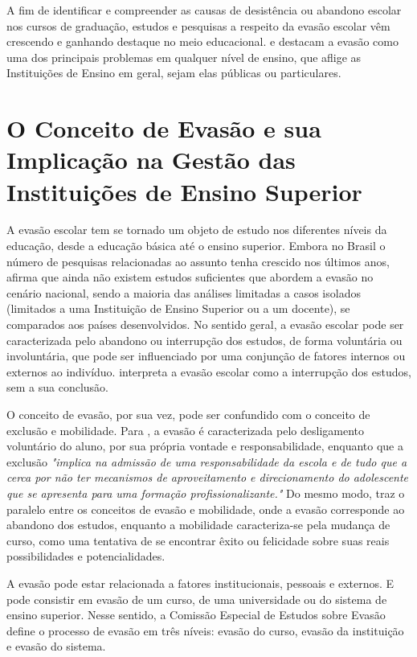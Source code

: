 A fim de identificar e compreender as causas de desistência ou abandono escolar nos cursos de graduação, estudos e pesquisas a respeito da evasão escolar vêm crescendo e ganhando destaque no meio educacional. \citet{lobo2011} e \citet{dias2010} destacam a evasão como uma dos principais problemas em qualquer nível de ensino, que aflige as Instituições de Ensino em geral, sejam elas públicas ou particulares.
 

\section{O Conceito de Evasão e sua Implicação na Gestão das Instituições de Ensino Superior} \label{2title2}

A evasão escolar tem se tornado um  objeto de estudo nos diferentes níveis da educação, desde a educação básica até o ensino superior. Embora no Brasil o número de pesquisas relacionadas ao assunto tenha crescido nos últimos anos, \citet{lobo2011} afirma que ainda não existem estudos suficientes que abordem a evasão no cenário nacional, sendo a maioria das análises limitadas a casos isolados (limitados a uma Instituição de Ensino Superior ou a um docente), se comparados aos países desenvolvidos. No sentido geral, a evasão escolar pode ser caracterizada pelo abandono ou interrupção dos estudos, de forma voluntária ou involuntária, que pode ser influenciado por uma conjunção de fatores internos ou externos ao indivíduo. \citet{gaioso2005} interpreta a evasão escolar como a interrupção dos estudos, sem a sua conclusão. 

O conceito de evasão, por sua vez, pode ser confundido com o conceito de exclusão e mobilidade. Para \citet[p. 13]{bueno1993}, a evasão é caracterizada pelo desligamento voluntário do aluno, por sua própria vontade e responsabilidade, enquanto que a exclusão \textit{"implica na admissão de uma responsabilidade da escola e de tudo que a cerca por não ter mecanismos de aproveitamento e direcionamento do adolescente que se apresenta para uma formação profissionalizante."} Do mesmo modo, \citet{ristoff1997} traz o paralelo entre os conceitos de evasão e mobilidade, onde a evasão corresponde ao abandono dos estudos, enquanto a mobilidade caracteriza-se pela mudança de curso, como uma tentativa de se encontrar êxito ou felicidade sobre suas reais possibilidades e potencialidades.

A evasão pode estar relacionada a fatores institucionais, pessoais e externos. E pode consistir em evasão de um curso, de uma universidade ou do sistema de ensino superior. Nesse sentido, a Comissão Especial de Estudos sobre Evasão \citep{mec_1997} define o processo de evasão em três níveis: evasão do curso, evasão da instituição e evasão do sistema.

